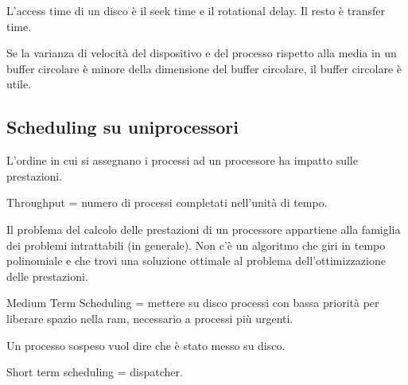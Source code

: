 L'access time di un disco \`e il seek time e il rotational delay. Il resto \`e transfer time.

Se la varianza di velocit\`a del dispositivo e del processo rispetto alla media in un buffer circolare \`e minore della dimensione del buffer circolare, il buffer circolare \`e utile.

\subsection{Scheduling su uniprocessori}

L'ordine in cui si assegnano i processi ad un processore ha impatto sulle prestazioni.

Throughput = numero di processi completati nell'unit\`a di tempo.

Il problema del calcolo delle prestazioni di un processore appartiene alla famiglia dei problemi intrattabili (in generale). Non c'\`e un algoritmo che giri in tempo polinomiale e che trovi una soluzione ottimale al problema dell'ottimizzazione delle prestazioni.

Medium Term Scheduling = mettere su disco processi con bassa priorit\`a per liberare spazio nella ram, necessario a processi pi\`u urgenti.

Un processo sospeso vuol dire che \`e stato messo su disco.

Short term scheduling = dispatcher.
















